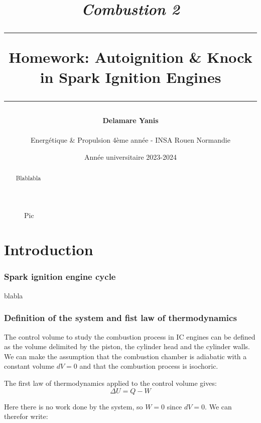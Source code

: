 \documentclass[11pt, a4paper]{article} %
\title{\textit{Combustion 2}\\
\vspace{1cm}
\hrule
\vspace{0.5cm}
\textbf{Homework: Autoignition \& Knock in Spark Ignition Engines}
\vspace{0.5cm}
\hrule}
\author{\textbf{Delamare Yanis}\\
~\\
Energétique \& Propulsion 4ème année - INSA Rouen Normandie}
\date{Année universitaire 2023-2024}
\begin{document}
\maketitle

\begin{figure}[H]
    \centering
    \caption{Pic}
\end{figure}

\maketitle\thispagestyle{empty}

\vspace{0.1cm}

\begin{abstract}
    Blablabla
\end{abstract}


\newpage

\tableofcontents
{}


\newpage
\fancyfoot[C]{\thepage}
\setcounter{page}{1}
\part{Introduction}


\section{Spark ignition engine cycle}

blabla

\section{Definition of the system and fist law of thermodynamics}

The control volume to study the combustion process in IC engines can be defined as the volume delimited by the piston, the cylinder head and the cylinder walls. 
We can make the assumption that the combustion chamber is adiabatic with a constant volume $dV = 0$ and that the combustion process is isochoric.

The first law of thermodynamics applied to the control volume gives:
\begin{equation}
    \Delta U = Q - W
\end{equation}

Here there is no work done by the system, so $W = 0$ since $dV = 0$. We can therefor write:
\end{document}
